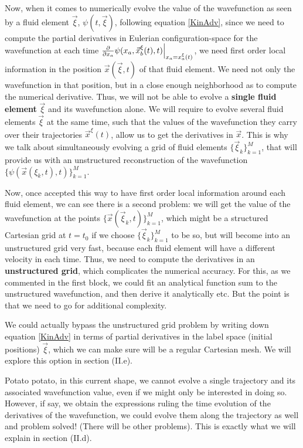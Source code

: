 \documentclass[11pt, a4paper]{article} %
\begin{document}
Now, when it comes to numerically evolve the value of the wavefunction as seen by a fluid element $\vec{\xi}$, $\psi(t,\vec{\xi})$, following equation \eqref{KinAdv}, since we need to compute the partial derivatives in Eulerian configuration-space for the wavefunction at each time $\pdv{}{x_a}\psi(x_a,\vec{x}_b^\xi(t), t)\Big\rvert_{x_a=x^\xi_a(t)}$, we need first order local information in the position $\vec{x}(\vec{\xi},t)$ of that fluid element. We need not only the wavefunction in that position, but in a close enough neighborhood as to compute the numerical derivative. Thus, we will not be able to evolve a {\bf single fluid element} $\vec{\xi}$ and its wavefunction alone. We will require to evolve several fluid elements $\vec{\xi}$ at the same time, such that the values of the wavefunction they carry over their trajectories $\vec{x}^\xi(t)$, allow us to get the derivatives in $\vec{x}$. This is why we talk about simultaneously evolving a grid of fluid elements $\{\vec{\xi}_k\}_{k=1}^M$, that will provide us with an unstructured reconstruction of the wavefunction $\{\psi(\vec{x}(\xi_k,t),t) \}_{k=1}^M$. 

Now, once accepted this way to have first order local information around each fluid element, we can see there is a second problem: we will get the value of the wavefunction at the points $\{\vec{x}(\vec{\xi}_k,t)\}_{k=1}^M$, which might be a structured Cartesian grid at $t=t_0$ if we choose $\{\vec{\xi}_k\}_{k=1}^M$ to be so, but will become into an unstructured grid very fast, because each fluid element will have a different velocity in each time. Thus, we need to compute the derivatives in an {\bf unstructured grid}, which complicates the numerical accuracy. For this, as we commented in the first block, we could fit an analytical function sum to the unstructured wavefunction, and then derive it analytically etc. But the point is that we need to go for additional complexity.

We could actually bypass the unstructured grid problem by writing down equation \eqref{KinAdv} in terms of partial derivatives in the label space (initial positions) $\vec{\xi}$, which we can make sure will be a regular Cartesian mesh. We will explore this option in section (II.e). 

Potato potato, in this current shape, we cannot evolve a single trajectory and its associated wavefunction value, even if we might only be interested in doing so. However, if say, we obtain the expressions ruling the time evolution of the derivatives of the wavefunction, we could evolve them along the trajectory as well and problem solved! (There will be other problems). This is exactly what we will explain in section (II.d).
\end{document}
